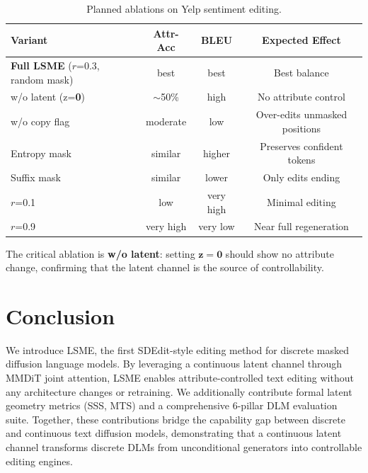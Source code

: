 \documentclass{article}
\begin{document}
\begin{table}[h]
\centering
\caption{Planned ablations on Yelp sentiment editing.}
\begin{tabular}{lccc}
\toprule
\textbf{Variant} & \textbf{Attr-Acc} & \textbf{BLEU} & \textbf{Expected Effect} \\
\midrule
\textbf{Full LSME} ($r$=0.3, random mask) & best & best & Best balance \\
\addlinespace
w/o latent (z=\textbf{0}) & $\sim$50\% & high & No attribute control \\
w/o copy flag & moderate & low & Over-edits unmasked positions \\
Entropy mask & similar & higher & Preserves confident tokens \\
Suffix mask & similar & lower & Only edits ending \\
$r$=0.1 & low & very high & Minimal editing \\
$r$=0.9 & very high & very low & Near full regeneration \\
\bottomrule
\end{tabular}
\end{table}

The critical ablation is \textbf{w/o latent}: setting $\mathbf{z} = \mathbf{0}$ should show no attribute change, confirming that the latent channel is the source of controllability.

\section{Conclusion}

We introduce LSME, the first SDEdit-style editing method for discrete masked diffusion language models.
By leveraging a continuous latent channel through MMDiT joint attention, LSME enables attribute-controlled text editing without any architecture changes or retraining.
We additionally contribute formal latent geometry metrics (SSS, MTS) and a comprehensive 6-pillar DLM evaluation suite.
Together, these contributions bridge the capability gap between discrete and continuous text diffusion models, demonstrating that a continuous latent channel transforms discrete DLMs from unconditional generators into controllable editing engines.
\end{document}
